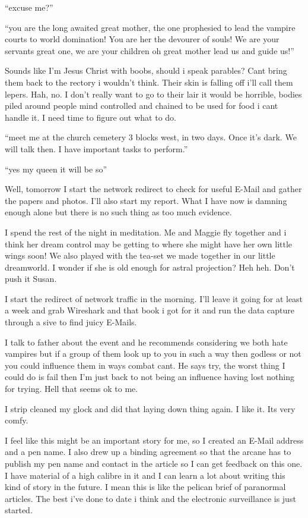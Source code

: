 ``excuse me?''

``you are the long awaited great mother, the one prophesied to lead the vampire courts to world domination! You are her the devourer of souls! We are your servants great one, we are your children oh great mother lead us and guide us!''

Sounds like I'm Jesus Christ with boobs, should i speak parables? Cant bring them back to the rectory i wouldn't think. Their skin is falling off i'll call them lepers. Hah, no. I don't really want to go to their lair it would be horrible, bodies piled around people mind controlled and chained to be used for food i cant handle it. I need time to figure out what to do.

``meet me at the church cemetery 3 blocks west, in two days. Once it's dark. We will talk then. I have important tasks to perform.''

``yes my queen it will be so''

Well, tomorrow I start the network redirect to check for useful E-Mail and gather the papers and photos. I'll also start my report. What I have now is damning enough alone but there is no such thing as too much evidence.

I spend the rest of the night in meditation. Me and Maggie fly together and i think her dream control may be getting to where she might have her own little wings soon! We also played with the tea-set we made together in our little dreamworld. I wonder if she is old enough for astral projection? Heh heh. Don't push it Susan.

I start the redirect of network traffic in the morning. I'll leave it going for at least a week and grab Wireshark and that book i got for it and run the data capture through a sive to find juicy E-Mails.

I talk to father about the event and he recommends considering we both hate vampires but if a group of them look up to you in such a way then godless or not you could influence them in ways combat cant. He says try, the worst thing I could do is fail then I'm just back to not being an influence having lost nothing for trying. Hell that seems ok to me.

I strip cleaned my glock and did that laying down thing again. I like it. Its very comfy.

I feel like this might be an important story for me, so I created an E-Mail address and a pen name. I also drew up a binding agreement so that the arcane has to publish my pen name and contact in the article so I can get feedback on this one. I have material of a high calibre in it and I can learn a lot about writing this kind of story in the future. I mean this is like the pelican brief of paranormal articles. The best i've done to date i think and the electronic surveillance is just started.

